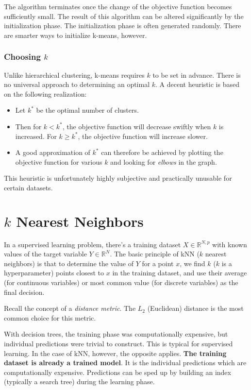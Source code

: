 \documentclass[a4paper]{article}
\begin{document}
	The algorithm terminates once the change of the objective function
	becomes sufficiently small. The result of this algorithm can be altered
	significantly by the initialization phase. The initialization phase is
	often generated randomly. There are smarter ways to initialize k-means,
	however.

	\subsubsection{Choosing $k$}
	Unlike hierarchical clustering, k-means requires $k$ to be set in advance.
	There is no universal approach to determining an optimal $k$. A decent
	heuristic is based on the following realization:
	\begin{itemize}
		\item Let $k^*$ be the optimal number of clusters.
		\item Then for $k < k^*$, the objective function will decrease swiftly
			when $k$ is increased. For $k \ge k^*$, the objective function
			will increase slower.
		\item A good approximation of $k^*$ can therefore be achieved by
			plotting the objective function for various $k$ and looking
			for \textit{elbows} in the graph.
	\end{itemize}

	This heuristic is unfortunately highly subjective and practically
	unusable for certain datasets.

	\section{$k$ Nearest Neighbors}
	In a supervised learning problem, there's a training dataset $X \in \mathbb{R}^{N, p}$ with
	known values of the target variable $Y \in \mathbb{R}^N$. The basic principle of
	kNN ($k$ nearest neighbors) is that to determine the value of $Y$ for a point
	$x$, we find $k$ ($k$ is a hyperparameter) points closest to $x$ in the training
	dataset, and use their average (for continuous variables) or most common value
	(for discrete variables) as the final decision.

	Recall the concept of a \textit{distance metric}. The $L_2$ (Euclidean) distance
	is the most common choice for this metric.

	With decision trees, the training phase was computationally expensive, but
	individual predictions were trivial to construct. This is typical for supervised
	learning. In the case of kNN, however, the opposite applies. \textbf{The training
	dataset is already a trained model}. It is the individual predictions which are
	computationally expensive. Predictions can be sped up by building an index
	(typically a search tree) during the learning phase.
\end{document}
